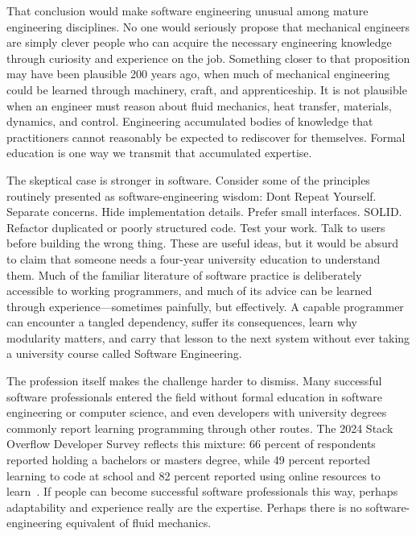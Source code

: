 
That conclusion would make software engineering unusual among mature engineering disciplines. No one would seriously propose that mechanical engineers are simply clever people who can acquire the necessary engineering knowledge through curiosity and experience on the job. Something closer to that proposition may have been plausible 200 years ago, when much of mechanical engineering could be learned through machinery, craft, and apprenticeship. It is not plausible when an engineer must reason about fluid mechanics, heat transfer, materials, dynamics, and control. Engineering accumulated bodies of knowledge that practitioners cannot reasonably be expected to rediscover for themselves. Formal education is one way we transmit that accumulated expertise.


The skeptical case is stronger in software. Consider some of the principles routinely presented as software-engineering wisdom: Don\textquotesingle t Repeat Yourself. Separate concerns. Hide implementation details. Prefer small interfaces. SOLID. Refactor duplicated or poorly structured code. Test your work. Talk to users before building the wrong thing. These are useful ideas, but it would be absurd to claim that someone needs a four-year university education to understand them. Much of the familiar literature of software practice is deliberately accessible to working programmers, and much of its advice can be learned through experience---sometimes painfully, but effectively. A capable programmer can encounter a tangled dependency, suffer its consequences, learn why modularity matters, and carry that lesson to the next system without ever taking a university course called Software Engineering.


The profession itself makes the challenge harder to dismiss. Many successful software professionals entered the field without formal education in software engineering or computer science, and even developers with university degrees commonly report learning programming through other routes. The 2024 Stack Overflow Developer Survey reflects this mixture: 66 percent of respondents reported holding a bachelor\textquotesingle s or master\textquotesingle s degree, while 49 percent reported learning to code at school and 82 percent reported using online resources to learn~\citep{stackoverflow2024survey}. If people can become successful software professionals this way, perhaps adaptability and experience really are the expertise. Perhaps there is no software-engineering equivalent of fluid mechanics.

